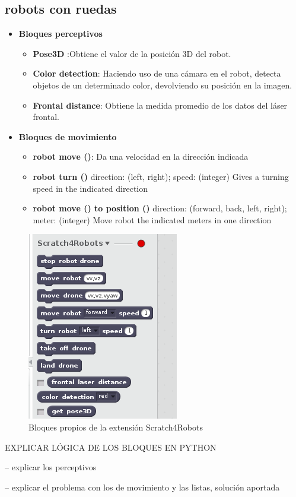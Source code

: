 \subsection{robots con ruedas}
\begin{itemize}
\item \textbf{Bloques perceptivos}
	\begin{itemize}
	\item \textbf{Pose3D} :Obtiene el valor de la posición 3D del robot.
	\item \textbf{Color detection}: Haciendo uso de una cámara en el robot, detecta objetos de un determinado color, devolviendo su posición en la imagen.
	\item \textbf{Frontal distance}: Obtiene la medida promedio de los datos del láser frontal. 
	\end{itemize}
\item \textbf{Bloques de movimiento}
	\begin{itemize}

	\item \textbf{robot move ()}: Da una velocidad en la dirección indicada
	\item \textbf{robot turn ()} direction: (left, right); speed: (integer) Gives a turning speed in the indicated direction
	\item \textbf{robot move () to position ()} direction: (forward, back, left, right); meter: (integer)	Move robot the indicated meters in one direction
	\end{itemize}
\end{itemize}

\begin{figure}[H]
    \centering
    \includegraphics[scale=0.75]{img/bloques-s4r.png}
  	\caption{Bloques propios de la extensión Scratch4Robots}
  	\label{fig:curiosity}
\end{figure}



EXPLICAR LÓGICA DE LOS BLOQUES EN PYTHON

-- explicar los perceptivos

-- explicar el problema con los de movimiento y las listas, solución aportada
